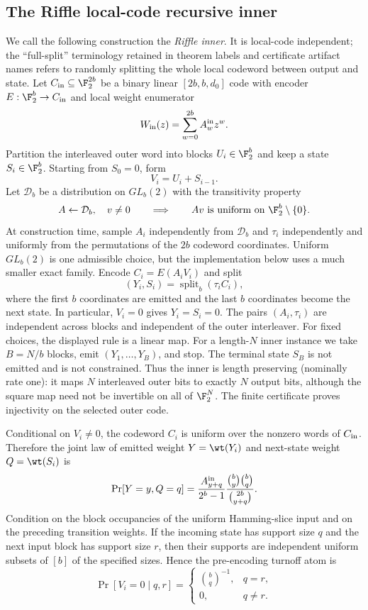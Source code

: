 \subsection{The Riffle local-code recursive inner}
\label{sec:fullsplit-local-code-inner}

We call the following construction the \emph{Riffle inner}.  It is
local-code independent; the ``full-split'' terminology retained in theorem
labels and certificate artifact names refers to randomly splitting the whole
local codeword between output and state.  Let
\(C_{\rm in}\subseteq\F_2^{2b}\) be a binary linear \([2b,b,d_0]\) code with
encoder \(E:\F_2^b\to C_{\rm in}\) and local weight enumerator
\[
W_{\rm in}(z)=\sum_{w=0}^{2b} A_w^{\rm in}z^w .
\]
Partition the interleaved outer word into blocks \(U_i\in\F_2^b\) and keep a
state \(S_i\in\F_2^b\).  Starting from \(S_0=0\), form
\[
V_i=U_i+S_{i-1}.
\]
Let \(\mathcal D_b\) be a distribution on \(GL_b(2)\) with the transitivity
property
\[
 A\leftarrow\mathcal D_b,\quad v\ne0
 \qquad\Longrightarrow\qquad
 Av\text{ is uniform on }\F_2^b\setminus\{0\}.
\]
At construction time, sample \(A_i\) independently from \(\mathcal D_b\)
and \(\tau_i\) independently and uniformly from the permutations of the
\(2b\) codeword coordinates.  Uniform \(GL_b(2)\) is one admissible choice,
but the implementation below uses a much smaller exact family.  Encode
\(C_i=E(A_iV_i)\) and split
\[
(Y_i,S_i)=\operatorname{split}_b(\tau_i C_i),
\]
where the first \(b\) coordinates are emitted and the last \(b\) coordinates
become the next state.  In particular, \(V_i=0\) gives \(Y_i=S_i=0\).
The pairs \((A_i,\tau_i)\) are independent across blocks and independent of the
outer interleaver.  For fixed choices, the displayed rule is a linear map.
For a length-\(N\) inner instance we take \(B=N/b\) blocks, emit
\((Y_1,\dots,Y_B)\), and stop.  The terminal state \(S_B\) is not emitted and
is not constrained.  Thus the inner is length preserving (nominally rate one):
it maps \(N\) interleaved outer bits to exactly \(N\) output bits, although the
square map need not be invertible on all of \(\F_2^N\).  The finite certificate
proves injectivity on the selected outer code.

\begin{lemma}
\label{lem:fullsplit-one-step-law}
Conditional on \(V_i\ne0\), the codeword \(C_i\) is uniform over the nonzero
words of \(C_{\rm in}\).  Therefore the joint law of emitted weight
\(Y=\wt(Y_i)\) and next-state weight \(Q=\wt(S_i)\) is
\[
\Pr[Y=y,Q=q]
=
\frac{A^{\rm in}_{y+q}}{2^b-1}
\frac{\binom{b}{y}\binom{b}{q}}{\binom{2b}{y+q}}.
\]
Condition on the block occupancies of the uniform Hamming-slice input and on
the preceding transition weights.  If the incoming state has support size
\(q\) and the next input block has support size \(r\), then their supports are
independent uniform subsets of \([b]\) of the specified sizes.  Hence the
pre-encoding turnoff atom is
\[
\Pr[V_i=0\mid q,r]
=
\begin{cases}
\binom{b}{q}^{-1}, & q=r,\\
0, & q\ne r.
\end{cases}
\]
\end{lemma}

